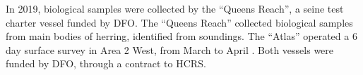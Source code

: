In 2019, biological samples were collected by the ``Queens Reach'', a seine test charter vessel funded by DFO.
The ``Queens Reach'' collected biological samples from main bodies of herring, identiﬁed from soundings.
The ``Atlas'' operated a 6 day surface survey in Area 2 West, from March  to April .
Both vessels were funded by DFO, through a contract to HCRS.
